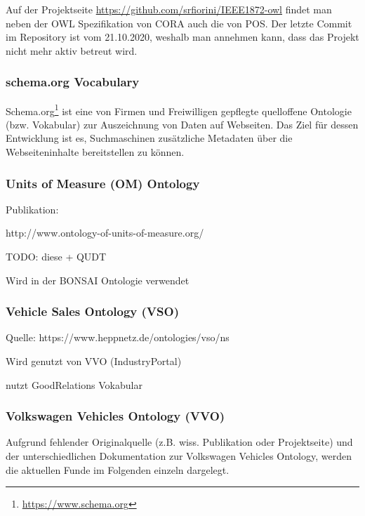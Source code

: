 \documentclass{article}
\begin{document}
Auf der Projektseite \url{https://github.com/srfiorini/IEEE1872-owl} findet man neben der OWL Spezifikation von CORA auch die von POS. Der letzte Commit im Repository ist vom 21.10.2020, weshalb man annehmen kann, dass das Projekt nicht mehr aktiv betreut wird.

\subsubsection{schema.org Vocabulary}

Schema.org\footnote{\url{https://www.schema.org}} ist eine von Firmen und Freiwilligen gepflegte quelloffene Ontologie (bzw. Vokabular) zur Auszeichnung von Daten auf Webseiten.
Das Ziel für dessen Entwicklung ist es, Suchmaschinen zusätzliche Metadaten über die Webseiteninhalte bereitstellen zu können.


\subsubsection{Units of Measure (OM) Ontology}


Publikation: \cite{rijgersberg2013ontology}

http://www.ontology-of-units-of-measure.org/

TODO: diese + QUDT

Wird in der BONSAI Ontologie \cite{ghose2022core} verwendet


\subsubsection{Vehicle Sales Ontology (VSO)}

Quelle: https://www.heppnetz.de/ontologies/vso/ns

Wird genutzt von VVO (IndustryPortal)

nutzt GoodRelations Vokabular

\subsubsection{Volkswagen Vehicles Ontology (VVO)}

Aufgrund fehlender Originalquelle (z.B. wiss. Publikation oder Projektseite) und der unterschiedlichen Dokumentation zur Volkswagen Vehicles Ontology, werden die aktuellen Funde im Folgenden einzeln dargelegt.
\end{document}
